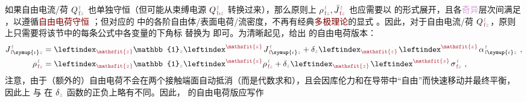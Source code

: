 如果自由电流/荷 ${Q}^{\;\!\mathcolor{gray}{t}}_{\;\!\textcolor{Maroon}{\text{f}}\mathcolor{gray}{z}}$ 也单独守恒（但可能从束缚电源 ${Q}^{\;\!\mathcolor{gray}{t}}_{\;\!\textcolor{Maroon}{\text{b}}\mathcolor{gray}{z}}$ 转换过来），那么原则上 ${\rho}^{\;\!\mathcolor{gray}{t}}_{\;\!\textcolor{Maroon}{\text{f}}\mathcolor{gray}{z}},\bar{J}^{\;\!\mathcolor{gray}{t}}_{\;\!\textcolor{Maroon}{\text{f}}\mathcolor{gray}{z}}$ 也应需要以  的形式展开，且各\textcolor{Plum}{奇异}层次间满足 ，以遵循\textcolor{Maroon}{自由电荷守恒} ；但对应的  中的各阶自由体/表面电荷/流密度，不再有经典\textcolor{Maroon}{多极理论}的显式 。因此，对于自由电流/荷 ${Q}^{\;\!\mathcolor{gray}{t}}_{\;\!\textcolor{Maroon}{\text{f}}\mathcolor{gray}{z}}$，原则上只需要将该节中的每条公式中各变量的下角标 \textcolor{Maroon}{} 替换为 \textcolor{Maroon}{} 即可。为清晰起见，给出  的自由电荷版本：
\begin{subequations} \label{eq:e-f-01}
	\abovedisplayskip=5pt
\begin{align}
	J^{\;\!\mathcolor{gray}{t}}_{\;\!\textcolor{Maroon}{\text{f}} \symup{\iota}\mathcolor{gray}{z}} &= \leftindex_{\textcolor{Maroon}{\mathsfit{z}}} {\mathbb{1}}_{\mathcolor{gray}{z}} \leftindex^{\textcolor{Maroon}{\mathsfit{z}}} \;\! J^{\;\!\mathcolor{gray}{t}}_{\;\!\textcolor{Maroon}{\text{f}} \symup{\iota}\mathcolor{gray}{z}} + \delta_{\mathcolor{gray}{z}} \leftindex_{\textcolor{Maroon}{\mathsfit{z}}} \;\! \leftindex^{\textcolor{Maroon}{\mathsfit{z}}} \;\!
	{\alpha}^{\;\!\mathcolor{gray}{t}}_{\;\!\textcolor{Maroon}{\text{f}} \symup{\iota}\mathcolor{gray}{z}} ~, \label{eq:j-f-01} \\
	{\rho}^{\;\!\mathcolor{gray}{t}}_{\;\!\textcolor{Maroon}{\text{f}}\mathcolor{gray}{z}} &= \leftindex_{\textcolor{Maroon}{\mathsfit{z}}} {\mathbb{1}}_{\mathcolor{gray}{z}} \leftindex^{\textcolor{Maroon}{\mathsfit{z}}} {\rho}^{\;\!\mathcolor{gray}{t}}_{\;\!\textcolor{Maroon}{\text{f}}\mathcolor{gray}{z}} + \delta_{\mathcolor{gray}{z}} \leftindex_{\textcolor{Maroon}{\mathsfit{z}}} \;\! \leftindex^{\textcolor{Maroon}{\mathsfit{z}}} \;\! {\sigma}^{\;\!\mathcolor{gray}{t}}_{\;\!\textcolor{Maroon}{\text{f}} \mathcolor{gray}{z}} ~, \label{eq:p-f-01}
\end{align}
\end{subequations}
注意，由于（额外的）自由电荷不会在两个接触端面自动抵消（而是代数求和），且会因库伦力和在导带中“自由”而快速移动并最终平衡，因此上  与  在 $\delta_{\mathcolor{gray}{z}}$ 函数的正负上略有不同。因此，  的自由电荷版应写作

